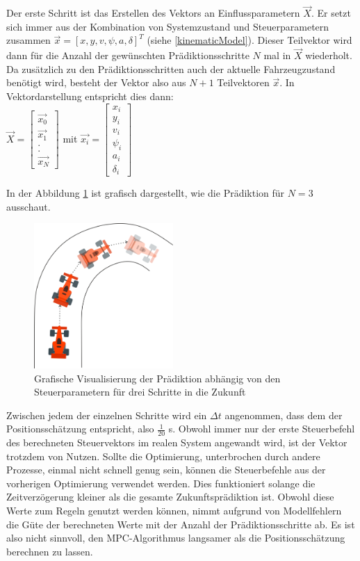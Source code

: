 \documentclass{like}
\begin{document}
Der erste Schritt ist das Erstellen des Vektors an Einflussparametern $\vec{X}$. Er setzt sich immer aus der Kombination von Systemzustand und Steuerparametern zusammen  $\vec{x} = [x, y, v, \psi, a, \delta ]^T $ (siehe \ref{kinematicModel}). 
Dieser Teilvektor wird dann für die Anzahl der gewünschten Prädiktionsschritte \(N\) mal in $\vec{X}$ wiederholt. 
Da zusätzlich zu den Prädiktionsschritten auch der aktuelle Fahrzeugzustand benötigt wird, besteht der Vektor also aus $N+1$ Teilvektoren $\vec{x}$. In Vektordarstellung entspricht dies dann: \\
$
\vec{X} = 
\begin{bmatrix}
\vec{x_0} \\ \vec{x_1} \\ . \\ . \\ \vec{x_N}
\end{bmatrix}
$ mit  $ \vec{x_i} = \begin{bmatrix}
x_i \\ y_i \\ v_i \\ \psi_i \\ a_i \\ \delta_i 
\end{bmatrix} $

 In der Abbildung \ref{fig:predictionMpc} ist grafisch dargestellt, wie die Prädiktion für $N=3$ ausschaut.
\begin{figure}[ht!]
	\centering
	\includegraphics[width=150pt]{Abbildungen/predictionMPC.png}
	\caption{Grafische Visualisierung der Prädiktion abhängig von den Steuerparametern für drei Schritte in die Zukunft}
	\label{fig:predictionMpc}
\end{figure}
Zwischen jedem der einzelnen Schritte wird ein $\Delta t$ angenommen, dass dem der Positionsschätzung entspricht, also $\frac{1}{20}$ s. Obwohl immer nur der erste Steuerbefehl des berechneten Steuervektors im realen System angewandt wird, ist der Vektor trotzdem von Nutzen. Sollte die Optimierung, unterbrochen durch andere Prozesse, einmal nicht schnell genug sein, können die Steuerbefehle aus der vorherigen Optimierung verwendet werden. Dies funktioniert solange die Zeitverzögerung kleiner als die gesamte Zukunftsprädiktion ist. Obwohl diese Werte zum Regeln genutzt werden können, nimmt aufgrund von Modellfehlern die Güte der berechneten Werte mit der Anzahl der Prädiktionsschritte ab. Es ist also nicht sinnvoll, den \ac{MPC}-Algorithmus langsamer als die Positionsschätzung berechnen zu lassen. 
\end{document}
